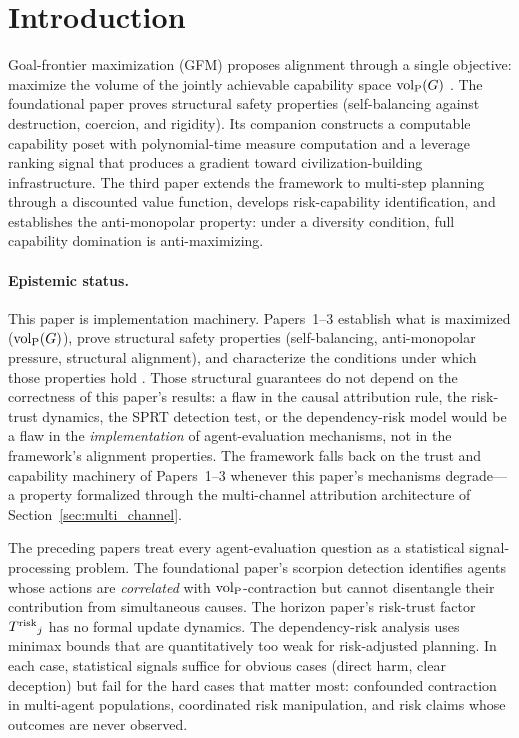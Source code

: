 \section{Introduction}
\label{sec:introduction}

Goal-frontier maximization (GFM) proposes alignment through a single
objective: maximize the volume of the jointly achievable capability space
${\operatorname{vol}_{\mathrm{P}}}(G)$ \citep{lasser2026gfm}. The foundational paper proves structural
safety properties (self-balancing against destruction, coercion, and
rigidity). Its companion \citep{lasser2026poset} constructs a computable
capability poset with polynomial-time measure computation and a leverage
ranking signal that produces a gradient toward civilization-building
infrastructure. The third paper \citep{lasser2026horizon} extends the
framework to multi-step planning through a discounted value function,
develops risk-capability identification, and establishes the anti-monopolar
property: under a diversity condition, full capability domination is
anti-maximizing.

\paragraph{Epistemic status.} This paper is implementation machinery.
Papers~1--3 establish what is maximized (${\operatorname{vol}_{\mathrm{P}}}(G)$), prove structural
safety properties (self-balancing, anti-monopolar pressure, structural
alignment), and characterize the conditions under which those properties
hold \citep{lasser2026gfm, lasser2026poset, lasser2026horizon}. Those
structural guarantees do not depend on the correctness of this paper's
results: a flaw in the causal attribution rule, the risk-trust dynamics,
the SPRT detection test, or the dependency-risk model would be a flaw
in the \emph{implementation} of agent-evaluation mechanisms, not in the
framework's alignment properties. The framework falls back on the trust
and capability machinery of Papers~1--3 whenever this paper's mechanisms
degrade---a property formalized through the multi-channel attribution
architecture of Section~\ref{sec:multi_channel}.

The preceding papers treat every agent-evaluation question as a statistical
signal-processing problem. The foundational paper's scorpion detection
\citep{lasser2026gfm} identifies agents whose actions are \emph{correlated}
with ${\operatorname{vol}_{\mathrm{P}}}$-contraction but cannot disentangle their contribution from
simultaneous causes. The horizon paper's risk-trust factor ${T^{\mathrm{risk}}}_j$
\citep{lasser2026horizon} has no formal update dynamics. The dependency-risk
analysis uses minimax bounds that are quantitatively too weak for
risk-adjusted planning. In each case, statistical signals suffice for
obvious cases (direct harm, clear deception) but fail for the hard cases
that matter most: confounded contraction in multi-agent populations,
coordinated risk manipulation, and risk claims whose outcomes are never
observed.

